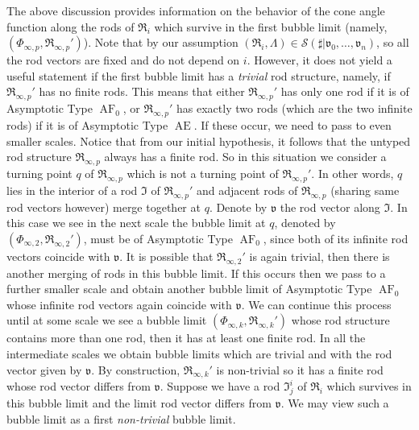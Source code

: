 \documentclass[a4paper,11pt]{amsart}
\theoremstyle{definition}
\numberwithin{equation}{section}
\newcommand{\mv} {\mathfrak v}
\newcommand{\mI} {\mathfrak I}
\newcommand{\mR} {\mathfrak R}
\DeclareMathOperator{\Ae}{AE}
\DeclareMathOperator{\AF}{AF}
\begin{document}
The above discussion provides information on the behavior of  the cone angle function along the rods of $\mR_i$ which survive in the first bubble limit (namely, $(\Phi_{\infty, p}, \mR_{\infty, p}')$). Note that by our assumption $(\mR_i,\Lambda)\in\mathcal S(\sharp|\mv_0,\ldots,\mv_n)$, so all the rod vectors are fixed and do not depend on $i$. However, it does not yield a useful statement if the first bubble limit has a \emph{trivial} rod structure, namely, if $\mR_{\infty, p}'$ has no finite rods. This means that either $\mR_{\infty, p}'$ has only one rod if it is of Asymptotic Type $\AF_0$, or $\mR_{\infty, p}'$ has exactly two rods (which are the two infinite rods) if it is of Asymptotic Type $\Ae$. If these occur, we need to pass to even smaller scales. 
Notice that from our initial hypothesis, it follows that the untyped rod structure $\mR_{\infty, p}$ always has a finite rod. So in this situation we consider a turning point $q$ of $\mR_{\infty, p}$ which is not a turning point of $\mR_{\infty, p}'$. In other words, $q$ lies in the interior of a rod $\mI$ of $\mR_{\infty, p}'$ and adjacent rods of $\mR_{\infty,p}$ (sharing same rod vectors however) merge together at $q$. Denote by $\mv$ the rod vector along $\mI$.  In this case we see in the next scale the bubble limit at $q$, denoted by $(\Phi_{\infty,2}, \mR_{\infty,2}')$, must be of Asymptotic Type $\AF_0$, since both of its infinite rod vectors coincide with $\mv$. It is possible that $\mR_{\infty,2}'$ is again trivial, then  there is another merging of rods in this bubble limit. If this occurs then we pass to a further smaller scale and obtain another bubble limit of Asymptotic Type $\AF_0$ whose infinite rod vectors again coincide with $\mv$. We can continue this process until at some scale we  see a bubble limit $(\Phi_{\infty,k}, \mR_{\infty,k}')$ whose rod structure contains more than one rod, then it has at least one finite rod. In all the intermediate scales we obtain bubble limits which are trivial and with the rod vector given by $\mv$. By construction, $\mR_{\infty,k}'$ is non-trivial so it has a finite rod whose rod vector differs from $\mv$. Suppose we have a rod $\mI_j^i$ of $\mR_i$ which survives in this bubble limit and the limit rod vector differs from $\mv$. We may view such a bubble limit as a first \emph{non-trivial} bubble limit. 
\end{document}
